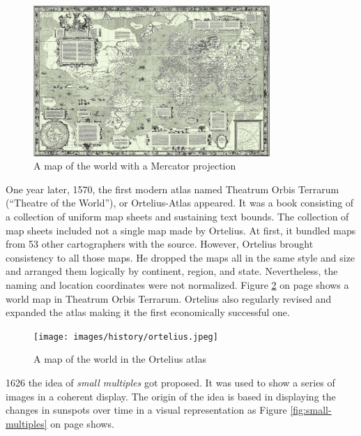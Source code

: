 \begin{figure}[!htb]
\centering
\includegraphics[width=0.8\textwidth,keepaspectratio]{images/history/mercator.png}
\caption[
    A map of the world with a Mercator projection, Urldate: 07.2016 \newline
\small\texttt{\url{https://upload.wikimedia.org/wikipedia/commons/b/b2/Mercator_1569.png}}
]{A map of the world with a Mercator projection}
\label{fig:mercator}
\end{figure}

One year later, 1570, the first modern atlas named Theatrum Orbis Terrarum (``Theatre of the World''), or Ortelius-Atlas appeared. It was a book consisting of a collection of uniform map sheets and sustaining text bounds. The collection of map sheets included not a single map made by Ortelius. At first, it bundled maps from 53 other cartographers with the source. However, Ortelius brought consistency to all those maps. He dropped the maps all in the same style and size and arranged them logically by continent, region, and state. Nevertheless, the naming and location coordinates were not normalized. Figure \ref{fig:ortelius} on page \pageref{fig:ortelius} shows a world map in Theatrum Orbis Terrarum. Ortelius also regularly revised and expanded the atlas making it the first economically successful one.

\begin{figure}[!htb]
\centering
\texttt{[image: images/history/ortelius.jpeg]}
\caption[
    A map of the world in the Ortelius atlas, Urldate: 07.2016 \newline
\small\texttt{\url{https://upload.wikimedia.org/wikipedia/commons/6/6f/OrteliusWorldMap.jpeg}}
]{A map of the world in the Ortelius atlas}
\label{fig:ortelius}
\end{figure}

1626 the idea of \textit{small multiples} got proposed. It was used to show a series of images in a coherent display. The origin of the idea is based in displaying the changes in sunspots over time in a visual representation as Figure \ref{fig:small-multiples} on page \pageref{fig:small-multiples} shows.

